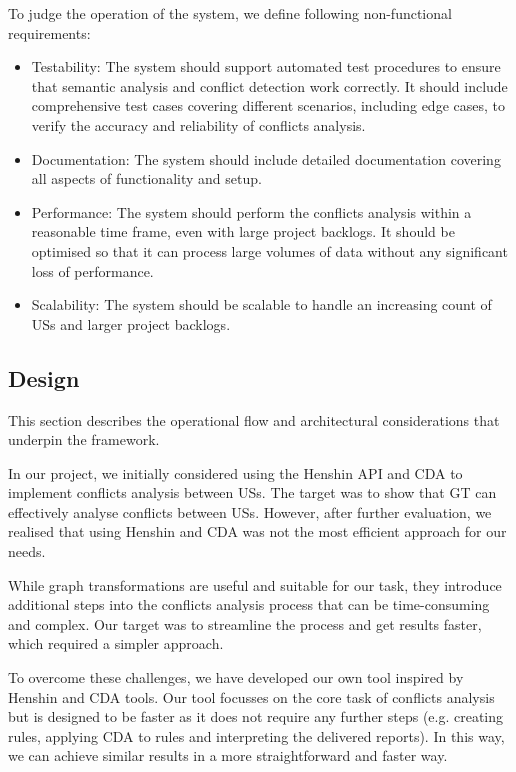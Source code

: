 To judge the operation of the system, we define following non-functional requirements:
\begin{itemize}
	\item Testability: The system should support automated test procedures to ensure that semantic analysis and conflict detection work correctly. It should include comprehensive test cases covering different scenarios, including edge cases, to verify the accuracy and reliability of conflicts analysis.
	
	\item Documentation: The system should include detailed documentation covering all aspects of functionality and setup.
	
	\item Performance: The system should perform the conflicts analysis within a reasonable time frame, even with large project backlogs. It should be optimised so that it can process large volumes of data without any significant loss of performance.
	
	\item Scalability: The system should be scalable to handle an increasing count of USs and larger project backlogs.
		
\end{itemize}

\subsection{Design}\label{conflict_desing}
This section describes the operational flow and architectural considerations that underpin the framework.

In our project, we initially considered using the Henshin API and CDA to implement conflicts analysis between USs. The target was to show that GT can effectively analyse conflicts between USs. However, after further evaluation, we realised that using Henshin and CDA was not the most efficient approach for our needs.

While graph transformations are useful and suitable for our task, they introduce additional steps into the conflicts analysis process that can be time-consuming and complex. Our target was to streamline the process and get results faster, which required a simpler approach.

To overcome these challenges, we have developed our own tool inspired by Henshin and CDA tools. Our tool focusses on the core task of conflicts analysis but is designed to be faster as it does not require any further steps (e.g. creating rules, applying CDA to rules and interpreting the delivered reports). In this way, we can achieve similar results in a more straightforward and faster way.

